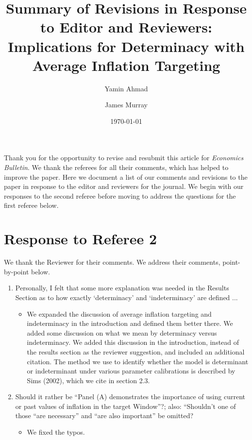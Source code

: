 \documentclass[english,authoryear,12pt]{elsarticle}
\def\baselinestretch{1}%
\def\baselinestretch{1}%
\gdef\thefootnote{\arabic{footnote}}%
\begin{document}
	\begin{frontmatter}
		\title{Summary of Revisions in Response to Editor and Reviewers: Implications for Determinacy with Average Inflation Targeting}
		\date{\today}
		\author[1]{Yamin Ahmad }
		\author[2]{James Murray}

		\address[1]{Dept. of Economics, University of Wisconsin - Whitewater, 809 W. Starin Road, Whitewater, WI 53190, USA}
		\address[2]{Dept. of Economics, University of Wisconsin - La Crosse, 1725 State St., La Crosse, WI 54601, USA}

\end{frontmatter}

\renewcommand{\thefootnote}{\arabic{footnote}}%
\setcounter{page}{1}%
\setcounter{footnote}{0}%

Thank you for the opportunity to revise and resubmit this article for \textit{Economics Bulletin}. We thank the referees for all their comments, which has helped to improve the paper. Here we document a list of our comments and revisions to the paper in response to the editor and reviewers for the journal. We begin with our responses to the second referee before moving to address the questions for the first referee below.

\section*{Response to Referee 2}
We thank the Reviewer for their comments. We address their comments, point-by-point below.
\begin{enumerate}
	\item Personally, I felt that some more explanation was needed in the Results Section as to how exactly ‘determinacy’ and ‘indeterminacy’ are defined ...
	\begin{itemize}
		\item We expanded the discussion of average inflation targeting and indeterminacy in the introduction and defined them better there. We added some discussion on what we mean by determinacy versus indeterminacy. We added this discussion in the introduction, instead of the results section as the reviewer suggestion, and included an additional citation. The method we use to identify whether the model is determinant or indeterminant under various parameter calibrations is described by Sims (2002), which we cite in section 2.3. 
	\end{itemize}
	\item Should it rather be ``Panel (A) demonstrates the importance of using current or past values of inflation in the target Window”?; also: ``Shouldn’t one of those ``are necessary” and ``are also important” be omitted?
	\begin{itemize}
		\item We fixed the typos.
	\end{itemize}
\end{enumerate}
\end{document}
